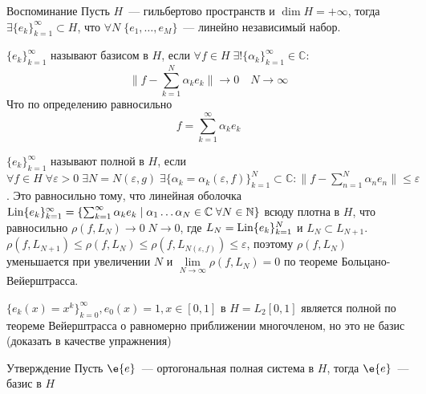 \documentclass[14pt]{extarticle}
\begin{document}
\begin{MathCl}{Воспоминание}
    Пусть $H$~--- гильбертово пространств и $\dim H = +\infty$, тогда 
    $\exists \{e_k\}_{k = 1}^\infty \subset H$, что $\forall N\; \{e_1,\dots,e_M\}$~--- линейно
    независимый набор.
\end{MathCl}
\begin{Opr}
    $\{e_k\}_{k = 1}^\infty$ называют базисом в $H$, если $\forall f \in H\;\exists!\{\alpha_
    k\}_{k = 1}^\infty \in \mathbb C\colon$
    $$
    \|f - \sum_{k = 1}^N \alpha_k e_k\| \to 0 \quad N \to \infty 
    $$
    Что по определению равносильно
    $$
    f = \sum_{k = 1}^\infty \alpha_k e_k
    $$
\end{Opr}
\begin{Opr}
    $\{e_k\}_{k = 1}^\infty$ называют полной в  $H$, если $\forall f \in H\; \forall \varepsilon
    > 0\;\exists N = N(\varepsilon, g)\; \exists \{\alpha_k = \alpha_k(\varepsilon, f)\}_{k = 1}^N
    \subset \mathbb C\colon \|f - \sum_{n = 1}^N \alpha_n e_n\| \le \varepsilon$.
    Это равносильно тому, что линейная оболочка $\operatorname{Lin}\{e_k\}_{k = 1}^\infty = \{\sum_{k = 
    1}^\infty \alpha_k e_k \mid \alpha_1 \dots \alpha_N \in \mathbb C\; \forall N \in \mathbb 
    N\}$ всюду плотна в $H$, что равносильно $\rho(f, L_N) \to 0\;N \to 0$, где $L_N = 
    \operatorname{Lin}\{e_k\}_{k = 1}^N$ и $L_N \subset L_{N + 1}$.
    $\rho(f, L_{N + 1}) \le \rho(f, L_N) \le \rho(f, L_{N(\varepsilon, f)}) \le \varepsilon$, поэтому
    $\rho(f, L_N)$ уменьшается при увеличении $N$ и $\lim \limits_{N \to \infty} \rho(f, 
    L_N) = 0$ по теореме Больцано-Вейерштрасса.
\end{Opr}
\begin{Prim}
    $\{e_k(x) = x^k\}_{k = 0}^\infty, e_0(x) = 1, x\in [0,1]$ в $H = L_2[0,1]$ является полной
    по теореме Вейерштрасса о равномерно приближении многочленом, но это не
    базис (доказать в качестве упражнения)
\end{Prim}
\begin{MathCl}{Утверждение}
    Пусть $\e{e}$~--- ортогональная полная система в $H$, тогда $\e{e}$~--- базис в $H$
\end{MathCl}
\end{document}
